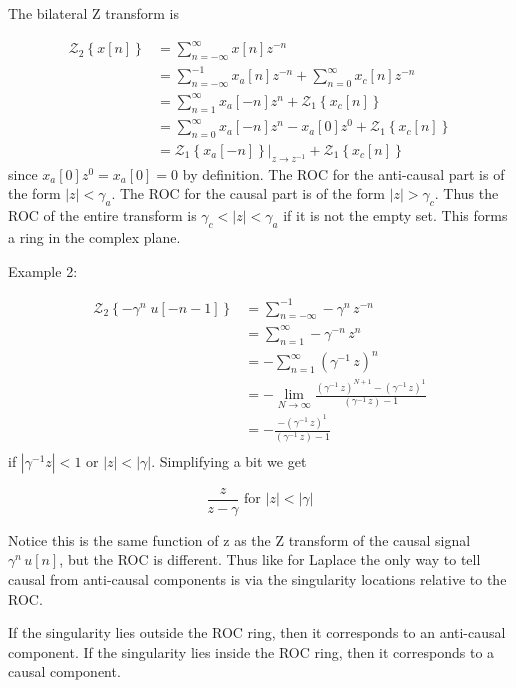 \documentclass{article}
\begin{document}
The bilateral Z transform is

$$
\begin{aligned}
  \mathcal{Z}_2\left\{x[n]\right\} &= \sum\limits_{n = -\infty}^{\infty} x[n] z^{-n}\\
  &= \sum\limits_{n = -\infty}^{-1} x_a[n] z^{-n} + \sum\limits_{n = 0}^{\infty} x_c[n] z^{-n}\\
  &= \sum\limits_{n = 1}^{\infty} x_a[-n] z^{n} + \mathcal{Z}_1\left\{x_c[n]\right\}\\
  &= \sum\limits_{n = 0}^{\infty} x_a[-n] z^{n} - x_a[0] z^{0} + \mathcal{Z}_1\left\{x_c[n]\right\}\\
  &= \left. \mathcal{Z}_1\left\{x_a[-n]\right\}\right|_{z \rightarrow z^{-1}} + \mathcal{Z}_1\left\{x_c[n]\right\}
\end{aligned}
$$
since $x_a[0] z^{0} = x_a[0] = 0$ by definition. The ROC for the anti-causal part is of the form $|z| < \gamma_a$. The ROC for the causal part is of the form $|z| > \gamma_c$. Thus the ROC of the entire transform is $\gamma_c < |z| < \gamma_a$ if it is not the empty set. This forms a ring in the complex plane.

Example 2:

$$
\begin{aligned}
  \mathcal{Z}_2\left\{ -\gamma^n\; u[-n-1]\right\} &= \sum\limits_{n = -\infty}^{-1} -\gamma^n\, z^{-n}\\
  &= \sum\limits_{n = 1}^{\infty} -\gamma^{-n}\, z^{n}\\
  &= -\sum\limits_{n = 1}^{\infty} \left(\gamma^{-1}\, z\right)^n\\
  &= - \lim_{N\rightarrow\infty} \frac{\left(\gamma^{-1}\, z\right)^{N+1} - \left(\gamma^{-1}\, z\right)^{1}}{\left(\gamma^{-1}\, z\right) - 1}\\
  &= - \frac{ - \left(\gamma^{-1}\, z\right)^{1}}{\left(\gamma^{-1}\, z\right) - 1}\\
\end{aligned}
$$
if $|\gamma^{-1} z| < 1$ or $|z| < |\gamma|$. Simplifying a bit we get

$$
\frac{z}{z-\gamma} \text{ for } |z| < |\gamma|
$$

Notice this is the same function of z as the Z transform of the causal signal $\gamma^n\, u[n]$, but the ROC is different. Thus like for Laplace the only way to tell causal from anti-causal components is via the singularity locations relative to the ROC.

If the singularity lies outside the ROC ring, then it corresponds to an anti-causal component. If the singularity lies inside the ROC ring, then it corresponds to a causal component. 
\end{document}
